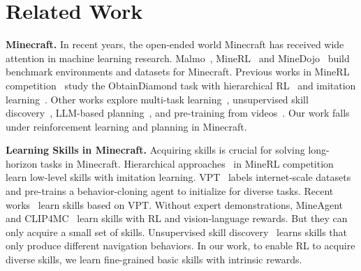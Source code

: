 \documentclass{article}
\newcommand{\mcstonepickaxe}{\texttt{[image: minecraft/stone\_pickaxe.png]}}
\begin{document}




\section{Related Work}

\textbf{Minecraft.} In recent years, the open-ended world Minecraft has received wide attention in machine learning research. Malmo~\citep{malmo}, MineRL~\citep{minerl} and MineDojo~\citep{minedojo} build benchmark environments and datasets for Minecraft. Previous works in MineRL competition~\citep{minerl2019, minerl2020, minerl2021} study the ObtainDiamond task with hierarchical RL~\citep{minerl2019, hdqfd, seihai,juewumc} and imitation learning~\citep{imitation-minecraft, minerl2020}. Other works explore multi-task learning~\citep{h-drln, multitask-curriculum, goal-aware-learning, DECKARD}, unsupervised skill discovery~\citep{unsupervised-skill}, LLM-based planning~\citep{deps,voyager,gitm}, and pre-training from videos~\citep{vpt,steve1, minedojo, clip4mc}. Our work falls under reinforcement learning and planning in Minecraft.

\textbf{Learning Skills in Minecraft.} Acquiring skills is crucial for solving long-horizon tasks in Minecraft. Hierarchical approaches~\citep{seihai, juewumc} in MineRL competition learn low-level skills with imitation learning. VPT~\citep{vpt} labels internet-scale datasets and pre-trains a behavior-cloning agent to initialize for diverse tasks. Recent works~\citep{goal-aware-learning, deps, DECKARD} learn skills based on VPT. Without expert demonstrations, MineAgent~\citep{minedojo} and CLIP4MC~\citep{clip4mc} learn skills with RL and vision-language rewards. But they can only acquire a small set of skills. Unsupervised skill discovery~\citep{unsupervised-skill} learns skills that only produce different navigation behaviors. In our work, to enable RL to acquire diverse skills, we learn fine-grained basic skills with intrinsic rewards.
\end{document}
